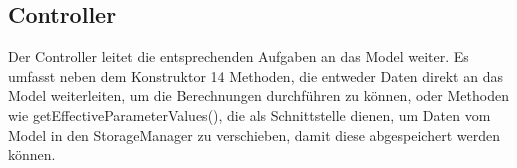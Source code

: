 \subsection{Controller} \label{subsec:controller}

Der Controller leitet die entsprechenden Aufgaben an das Model weiter. Es umfasst neben dem Konstruktor 14 Methoden, die entweder Daten direkt an das Model weiterleiten, um die Berechnungen durchführen zu können, oder Methoden wie getEffectiveParameterValues(), die als Schnittstelle dienen, um Daten vom Model in den StorageManager zu verschieben, damit diese abgespeichert werden können.


